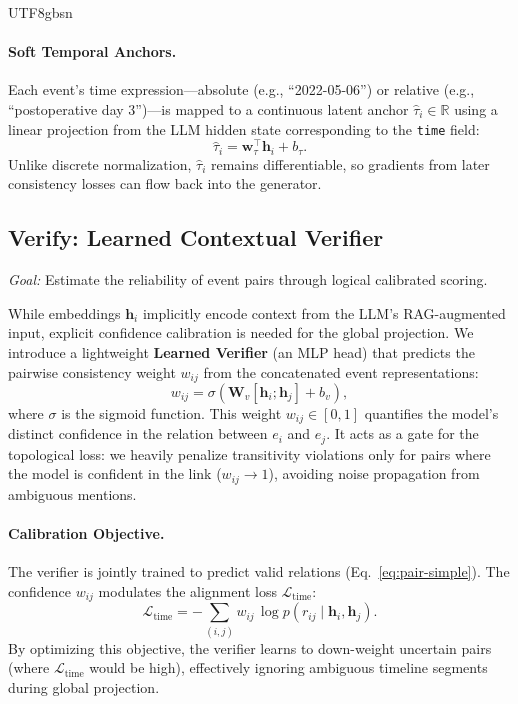 \documentclass[11pt]{article}
\begin{document}
\begin{CJK*}{UTF8}{gbsn}
\paragraph{Soft Temporal Anchors.}
Each event’s time expression—absolute (e.g., ``2022-05-06'') or relative (e.g., ``postoperative day 3'')—is mapped to a continuous latent anchor $\hat{\tau}_i \in \mathbb{R}$ using a linear projection from the LLM hidden state corresponding to the \texttt{time} field:
\begin{equation}
\hat{\tau}_i = \mathbf{w}_\tau^\top \mathbf{h}_i + b_\tau.
\label{eq:tau_estimation}
\end{equation}
Unlike discrete normalization, $\hat{\tau}_i$ remains differentiable, so gradients from later consistency losses can flow back into the generator.

\subsection{Verify: Learned Contextual Verifier}
\textit{Goal:} Estimate the reliability of event pairs through logical calibrated scoring.

While embeddings $\mathbf{h}_i$ implicitly encode context from the LLM's RAG-augmented input, explicit confidence calibration is needed for the global projection. We introduce a lightweight \textbf{Learned Verifier} (an MLP head) that predicts the pairwise consistency weight $w_{ij}$ from the concatenated event representations:
\begin{equation}
w_{ij} = \sigma(\mathbf{W}_v [\mathbf{h}_i; \mathbf{h}_j] + b_v),
\label{eq:pair-simple}
\end{equation}
where $\sigma$ is the sigmoid function. This weight $w_{ij} \in [0,1]$ quantifies the model's distinct confidence in the relation between $e_i$ and $e_j$. It acts as a gate for the topological loss: we heavily penalize transitivity violations only for pairs where the model is confident in the link ($w_{ij} \to 1$), avoiding noise propagation from ambiguous mentions.

\paragraph{Calibration Objective.}
The verifier is jointly trained to predict valid relations (Eq.~\ref{eq:pair-simple}). The confidence $w_{ij}$ modulates the alignment loss $\mathcal{L}_{\text{time}}$:
\begin{equation}
\label{eq:time_loss}
\mathcal{L}_{\text{time}} = -\sum_{(i,j)} w_{ij}\, \log p(r_{ij} \mid \mathbf{h}_i, \mathbf{h}_j).
\end{equation}
By optimizing this objective, the verifier learns to down-weight uncertain pairs (where $\mathcal{L}_{\text{time}}$ would be high), effectively ignoring ambiguous timeline segments during global projection.


\end{CJK*}
\end{document}
